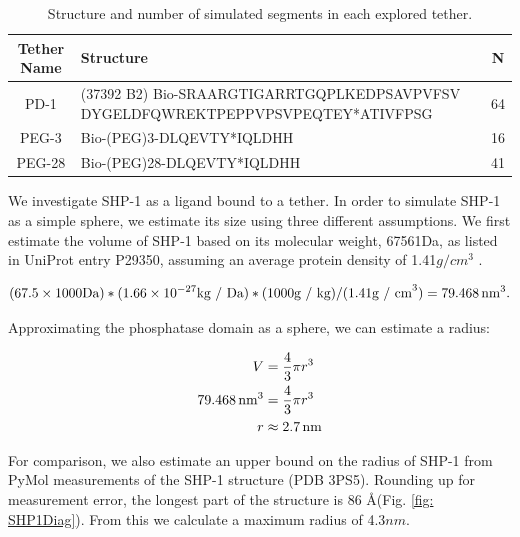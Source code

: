\documentclass[../../AdvancementSummary.tex]{subfiles}
\begin{document}
\begin{table}
\caption{Structure and number of simulated segments in each explored tether. \label{table: Tethers}}
\begin{center}
\begin{tabular}{| c | p{10cm} | c |}
    \hline
        Tether Name & Structure & N \\ 
        \hline 
        PD-1    &   (37392 B2) Bio-SRAARGTIGARRTGQPLKEDPSAVPVFSV
                    DYGELDFQWREKTPEPPVPSVPEQTEY*ATIVFPSG            &   64   \\
        PEG-3   &   Bio-(PEG)3-DLQEVTY*IQLDHH                           &   16   \\ 
        PEG-28  &   Bio-(PEG)28-DLQEVTY*IQLDHH                          &   41   \\
    \hline
\end{tabular}
\end{center}
\end{table}

We investigate SHP-1 as a ligand bound to a tether. In order to simulate SHP-1 as a simple sphere, we estimate its size using three different assumptions. We first estimate the volume of SHP-1 based on its molecular weight, 67561Da,  as listed in UniProt entry P29350, assuming an average protein density of 1.41$g/cm^3$ \cite{Fischer2004}.


\begin{equation*}
(67.5 \times 1000 \mbox{Da}) * (1.66\times10^{-27} \mbox{kg / Da}) * (1000 \mbox{g / kg}) / (1.41 \mbox{g / cm}^3) = 79.468 \,\mbox{nm}^3.
\end{equation*}

Approximating the phosphatase domain as a sphere, we can estimate a radius: 

\begin{align*}
V &= \frac{4}{3}\pi r^3 \\
79.468 \,\mbox{nm}^3 &= \frac{4}{3} \pi r^3 \\
r &\approx 2.7 \,\mbox{nm} \\
\end{align*}

For comparison, we also estimate an upper bound on the radius of SHP-1 from PyMol measurements of the SHP-1 structure (PDB 3PS5). Rounding up for measurement error, the longest part of the structure is 86 \AA (Fig. \ref{fig: SHP1Diag}). From this we calculate a maximum radius of 4.3$nm$.
\end{document}
